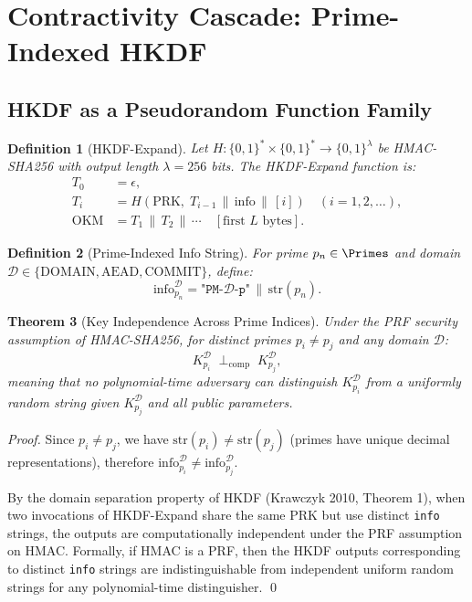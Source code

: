 \documentclass[11pt,letterpaper]{article}
\newtheorem{theorem}{Theorem}[section]
\newtheorem{definition}[theorem]{Definition}
\theoremstyle{remark}
\begin{document}
\section{Contractivity Cascade: Prime-Indexed HKDF}
\label{sec:hkdf-cascade}

\subsection{HKDF as a Pseudorandom Function Family}

\begin{definition}[HKDF-Expand]
Let $H: \{0,1\}^* \times \{0,1\}^* \to \{0,1\}^\lambda$ be HMAC-SHA256
with output length $\lambda = 256$ bits.  The HKDF-Expand function is:
\begin{align}
  T_0 &= \epsilon, \tag{A18}\\
  T_i &= H(\text{PRK},\; T_{i-1} \,\|\, \text{info} \,\|\, [i])
        \quad (i = 1, 2, \ldots), \tag{A19}\\
  \text{OKM} &= T_1 \,\|\, T_2 \,\|\, \cdots \quad [\text{first } L \text{ bytes}].
              \tag{A20}
\end{align}
\end{definition}

\begin{definition}[Prime-Indexed Info String]
For prime $p_n \in \Primes$ and domain $\mathcal{D} \in
\{\text{DOMAIN}, \text{AEAD}, \text{COMMIT}\}$, define:
\[
  \text{info}_{p_n}^{\mathcal{D}}
  = \texttt{"PM-}\mathcal{D}\texttt{-p"} \,\|\, \text{str}(p_n). \tag{A21}
\]
\end{definition}

\begin{theorem}[Key Independence Across Prime Indices]
\label{thm:key-indep}
Under the PRF security assumption of HMAC-SHA256, for distinct primes
$p_i \neq p_j$ and any domain $\mathcal{D}$:
\[
  K_{p_i}^{\mathcal{D}} \;\perp_{\text{comp}}\; K_{p_j}^{\mathcal{D}}, \tag{A22}
\]
meaning that no polynomial-time adversary can distinguish $K_{p_i}^{\mathcal{D}}$
from a uniformly random string given $K_{p_j}^{\mathcal{D}}$ and all
public parameters.
\end{theorem}

\begin{proof}
Since $p_i \neq p_j$, we have $\text{str}(p_i) \neq \text{str}(p_j)$ (primes
have unique decimal representations), therefore
$\text{info}_{p_i}^{\mathcal{D}} \neq \text{info}_{p_j}^{\mathcal{D}}$.

By the domain separation property of HKDF (Krawczyk 2010, Theorem 1),
when two invocations of HKDF-Expand share the same PRK but use distinct
\texttt{info} strings, the outputs are computationally independent under
the PRF assumption on HMAC.  Formally, if HMAC is a PRF, then the HKDF
outputs corresponding to distinct \texttt{info} strings are
indistinguishable from independent uniform random strings for any
polynomial-time distinguisher. \qed
\end{proof}
\end{document}
